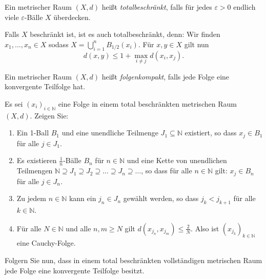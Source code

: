 \documentclass[
12pt, 
openany, 
a4paper, 
final,
fleqn, 
]{myclass}
\numberwithin{equation}{chapter}
\numberwithin{section}{chapter}
\newcommand{\union}{\bigcup}
\begin{document}
\begin{defn}
Ein metrischer Raum $ (X, d) $ heißt \emph{totalbeschränkt}, falls für jedes $ \varepsilon>0 $ endlich viele $\varepsilon$-Bälle $X$ überdecken. 
\end{defn}
\begin{rmk}
Falls $X$ beschränkt ist, ist es auch totalbeschränkt, denn: Wir finden $ x_{1},\dots,x_{n} \in X$ sodass 
$ X= \union_{i=1}^{n}B_{1/2}(x_{i}) $. Für $x, y\in X$ gilt nun 
\[
d(x, y) \leq 1 + \max_{i\neq j} d(x_{i}, x_{j}).
\] 
\end{rmk}

\begin{defn}
Ein metrischer Raum $ (X, d) $ heißt \emph{folgenkompakt}, falls jede Folge eine konvergente Teilfolge hat.
\end{defn}

\begin{ex}\label{exsheet7ex6}
Es sei $(x_i)_{i \in \mathbb{N}}$ eine Folge in einem total beschränkten metrischen Raum $(X, d)$. Zeigen Sie:
\begin{enumerate}[label=\textit{\alph*})]
\item Ein 1-Ball $B_1$ und eine unendliche Teilmenge $J_1 \subseteq \mathbb{N}$ existiert, so dass $x_j \in B_1$ für alle $j \in J_1$.
\item Es existieren $\frac{1}{n}$-Bälle $B_n$ für $n \in \mathbb{N}$ und eine Kette von unendlichen Teilmengen $\mathbb{N} \supseteq J_1 \supseteq J_2 \supseteq \dots \supseteq J_n \supseteq \dots$, so dass für alle $n \in \mathbb{N}$ gilt: $x_j \in B_n$ für alle $j \in J_n$.
\item Zu jedem $n \in \mathbb{N}$ kann ein $j_n \in J_n$ gewählt werden, so dass $j_k < j_{k+1}$ für alle $k \in \mathbb{N}$.
\item Für alle $N \in \mathbb{N}$ und alle $n, m \geq N$ gilt $d(x_{j_n}, x_{j_m}) \leq \frac{2}{N}$. Also ist $(x_{j_k})_{k \in \mathbb{N}}$ eine Cauchy-Folge.
\end{enumerate}
Folgern Sie nun, dass in einem total beschränkten vollständigen metrischen Raum jede Folge eine konvergente Teilfolge besitzt.
\end{ex}
\end{document}
